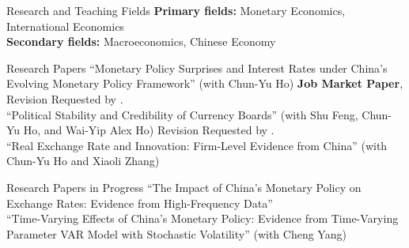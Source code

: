 \documentclass{resume_liang} %
\begin{document}
\begin{rSection}{Research and Teaching Fields}
{\bf Primary fields:} Monetary Economics, International Economics 
\vspace{0.1cm} \\ 
{\bf Secondary fields:} Macroeconomics, Chinese Economy
\\  
\end{rSection}
\bigskip  




\begin{rSection}{Research Papers}
``Monetary Policy Surprises and Interest Rates under China's Evolving Monetary Policy Framework'' (with Chun-Yu Ho) \textbf{Job Market Paper}, Revision Requested by \textit{}.
\vspace{0.2cm} \\
``Political Stability and Credibility of Currency Boards'' (with Shu Feng, Chun-Yu Ho, and Wai-Yip Alex Ho) Revision Requested by \textit{}.
\vspace{0.2cm} \\
``Real Exchange Rate and Innovation: Firm-Level Evidence from China'' (with Chun-Yu Ho and Xiaoli Zhang) 
\end{rSection}
\bigskip  




\begin{rSection}{Research Papers in Progress}
``The Impact of China's Monetary Policy on Exchange Rates: Evidence from High-Frequency Data''\vspace{0.2cm}
\\
``Time-Varying Effects of China's Monetary Policy: Evidence from Time-Varying Parameter VAR Model with Stochastic Volatility'' (with Cheng Yang)
\\
\end{rSection}
\bigskip  
\end{document}
